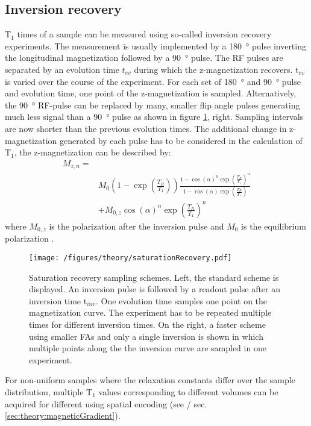         \subsection{Inversion recovery}
        T$_1$ times of a sample can be measured using so-called inversion recovery experiments. The measurement is usually implemented by a \SI{180}{\degree} pulse inverting the longitudinal magnetization followed by a \SI{90}{\degree} pulse. The RF pulses are separated by an evolution time $t_{ev}$ during which the z-magnetization recovers. t$_{ev}$ is varied over the course of the experiment. For each set of \SI{180}{\degree} and \SI{90}{\degree} pulse and evolution time, one point of the z-magnetization is sampled. Alternatively, the \SI{90}{\degree} RF-pulse can be replaced by many, smaller flip angle pulses generating much less signal than a \SI{90}{\degree} pulse as shown in figure \ref{figure:theory:inversionRecovery}, right. Sampling intervals are now shorter than the previous evolution times. The additional change in z-magnetization generated by each pulse has to be considered in the calculation of T$_1$, the z-magnetization can be described by:
        \begin{equation}
            \begin{split}
                M_{z,n} =& \\ &M_0 \left(1-\exp{\left(\frac{T_R}{T_1}\right)}\right)\frac{1-\cos(\alpha)^n\exp\left(\frac{T_R}{T_1}\right)^n}{1-\cos(\alpha)\exp\left(\frac{T_R}{T_1}\right)}\\ 
                         &+M_{0,z}\cos(\alpha)^n\exp\left(\frac{T_R}{T_1}\right)^n
            \end{split}
        \end{equation}
        where $M_{0,z}$ is the polarization after the inversion pulse and $M_0$ is the equilibrium polarization \cite{look_time_1970-1, drobnitzky_closed-form_2017}.
            \begin{figure}
                \centering
                \texttt{[image: /figures/theory/saturationRecovery.pdf]}
                \caption[Saturation recovery]{Saturation recovery sampling schemes. Left, the standard scheme is displayed. An inversion pulse is followed by a readout pulse after an inversion time t$_{inv}$. One evolution time samples one point on the magnetization curve. The experiment has to be repeated multiple times for different inversion times. On the right, a faster scheme using smaller FAs and only a single inversion is shown in which multiple points along the the inversion curve are sampled in one experiment.}
                \label{figure:theory:inversionRecovery}
            \end{figure}
            For non-uniform samples where the relaxation constants differ over the sample distribution, multiple T$_1$ values corresponding to different volumes can be acquired for different using spatial encoding (see \cite{scheffler_t1_2001} / sec. \ref{sec:theory:magneticGradient}).
